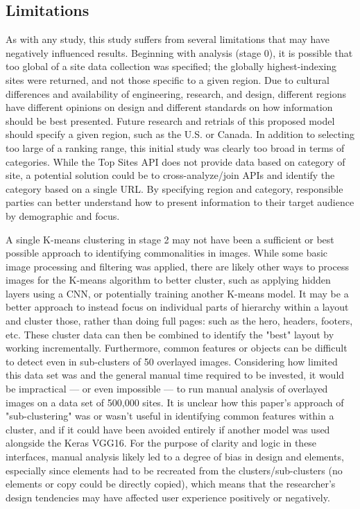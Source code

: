 \documentclass[conference]{IEEEtran}
\begin{document}
\subsection{Limitations}

As with any study, this study suffers from several limitations that may have negatively influenced results. Beginning with analysis (stage 0), it is possible that too global of a site data collection was specified; the globally highest-indexing sites were returned, and not those specific to a given region. Due to cultural differences and availability of engineering, research, and design, different regions have different opinions on design and different standards on how information should be best presented. Future research and retrials of this proposed model should specify a given region, such as the U.S. or Canada. In addition to selecting too large of a ranking range, this initial study was clearly too broad in terms of categories. While the Top Sites API does not provide data based on category of site, a potential solution could be to cross-analyze/join APIs and identify the category based on a single URL. By specifying region and category, responsible parties can better understand how to present information to their target audience by demographic and focus.

A single K-means clustering in stage 2 may not have been a sufficient or best possible approach to identifying commonalities in images. While some basic image processing and filtering was applied, there are likely other ways to process images for the K-means algorithm to better cluster, such as applying hidden layers using a CNN, or potentially training another K-means model. It may be a better approach to instead focus on individual parts of hierarchy within a layout and cluster those, rather than doing full pages: such as the hero, headers, footers, etc. These cluster data can then be combined to identify the "best" layout by working incrementally. Furthermore, common features or objects can be difficult to detect even in sub-clusters of 50 overlayed images. Considering how limited this data set was and the general manual time required to be invested, it would be impractical — or even impossible — to run manual analysis of overlayed images on a data set of 500,000 sites. It is unclear how this paper's approach of "sub-clustering" was or wasn't useful in identifying common features within a cluster, and if it could have been avoided entirely if another model was used alongside the Keras VGG16. For the purpose of clarity and logic in these interfaces, manual analysis likely led to a degree of bias in design and elements, especially since elements had to be recreated from the clusters/sub-clusters (no elements or copy could be directly copied), which means that the researcher's design tendencies may have affected user experience positively or negatively.
\end{document}
